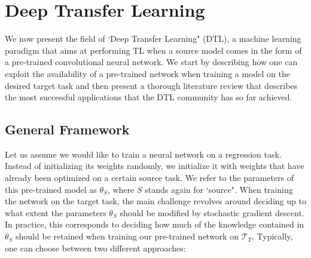 \section{Deep Transfer Learning}
\label{sec:literature_review}

We now present the field of `Deep Transfer Learning" (DTL), a machine learning paradigm that aims at performing TL when a source model comes in the form of a pre-trained convolutional neural network. We start by describing how one can exploit the availability of a pre-trained network when training a model on the desired target task and then present a thorough literature review that describes the most successful applications that the DTL community has so far achieved.

\subsection{General Framework}
\label{sec:tl_general_framework}

Let us assume we would like to train a neural network on a regression task. Instead of initializing its weights randomly, we initialize it with weights that have already been optimized on a certain source task. We refer to the parameters of this pre-trained model as $\theta_S$, where $S$ stands again for `source". When training the network on the target task, the main challenge revolves around deciding up to what extent the parameters $\theta_S$ should be modified by stochastic gradient descent. In practice, this corresponds to deciding how much of the knowledge contained in $\theta_S$ should be retained when training our pre-trained network on $\mathcal{T}_T$. Typically, one can choose between two different approaches:  

